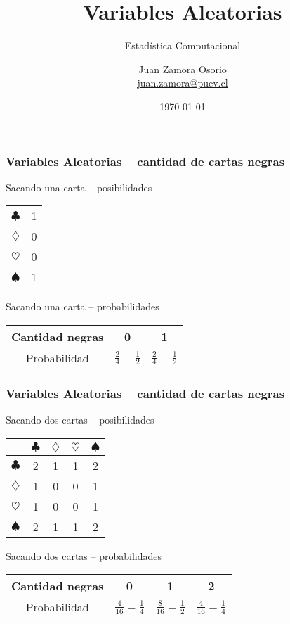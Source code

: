 \documentclass[table]{beamer}
\title{Variables Aleatorias}
\subtitle{Estadística Computacional}
\author[J.Z.O-2024]{Juan Zamora Osorio\\\url{juan.zamora@pucv.cl}}
\institute[PUCV]{Instituto de Estadística\\Pontificia Universidad Cat\'olica de Valpara\'iso}
\date{\today}
\begin{document}
\frame{\titlepage}



\begin{frame}
    \frametitle{Variables Aleatorias -- cantidad de cartas negras}
    \begin{block}{Sacando una carta -- posibilidades}
        \begin{center}
            \begin{tabular}{c|c}
                $\clubsuit$ & 1 \\
                $\diamondsuit$ & 0 \\
                $\heartsuit$ & 0 \\
                $\spadesuit$ & 1
            \end{tabular}
        \end{center}
    \end{block}
    \begin{block}{Sacando una carta -- probabilidades}
        \begin{center}
            \begin{tabular}{c|c|c}
                Cantidad negras & 0 & 1 \\
                \hline
                Probabilidad & $\frac{2}{4} = \frac{1}{2}$ & $\frac{2}{4} = \frac{1}{2}$
            \end{tabular}
        \end{center}
    \end{block}
\end{frame}

\begin{frame}
    \frametitle{Variables Aleatorias -- cantidad de cartas negras}
    \begin{block}{Sacando dos cartas -- posibilidades}
        \begin{center}
            \begin{tabular}{c|cccc}
                & $\clubsuit$ & $\diamondsuit$ & $\heartsuit$ & $\spadesuit$ \\
                \hline
                $\clubsuit$ & 2 & 1 & 1 & 2 \\
                $\diamondsuit$ & 1 & 0 & 0 & 1 \\
                $\heartsuit$ & 1 & 0 & 0 & 1 \\
                $\spadesuit$ & 2 & 1 & 1 & 2
            \end{tabular}
        \end{center}
    \end{block}
    \begin{block}{Sacando dos cartas -- probabilidades}
        \begin{center}
            \begin{tabular}{c|c|c|c}
                Cantidad negras & 0 & 1 & 2 \\
                \hline
                Probabilidad & $\frac{4}{16} = \frac{1}{4}$ &
                $\frac{8}{16} = \frac{1}{2}$ &
                $\frac{4}{16} = \frac{1}{4}$
            \end{tabular}
        \end{center}
    \end{block}
\end{frame}
\end{document}
